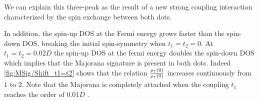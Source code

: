 

We can explain this three-peak as the result of a new strong coupling interaction characterized by the spin exchange between both dots. 

In addition, the spin-up DOS at the Fermi energy grows faster than the spin-down DOS, breaking the initial spin-symmetry when $t_1=t_2=0$. At $t_1=t_2=0.02D$ the spin-up DOS at the fermi energy doubles the spin-down DOS which implies that the Majorana signature  is present in both dots. %
Indeed \ref{fig:MSig/Shift_t1=t2} shows that the relation $\frac{\rho_\uparrow(0)}{\rho_\uparrow(0)}$ increases continuously from $1$ to $2$. Note that the Majorana is completely attached when the coupling $t_1$ reaches the order of $0.01D$ .